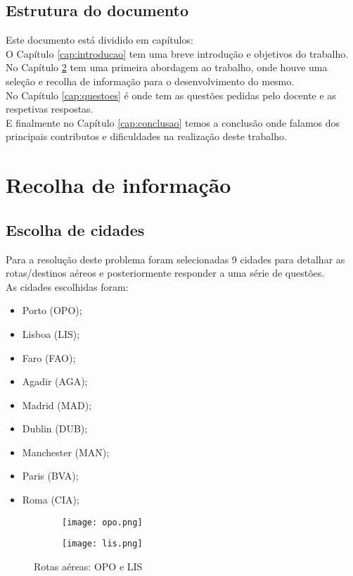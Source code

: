 \documentclass[a4wide]{report}
\begin{document}
\section{Estrutura do documento}
Este documento está dividido em  capítulos:\\O Capítulo \ref{cap:introducao} tem uma breve introdução e objetivos do trabalho.\\No Capítulo \ref{cap:recInfo} tem uma primeira abordagem ao trabalho, onde houve uma seleção e recolha de informação para o desenvolvimento do mesmo.\\No Capítulo \ref{cap:questoes} é onde tem as questões pedidas pelo docente e as respetivas respostas.\\E finalmente no Capítulo \ref{cap:conclusao} temos a conclusão onde falamos dos principais contributos e dificuldades na realização deste trabalho.

\chapter{Recolha de informação}
\label{cap:recInfo}
\section{Escolha de cidades}
Para a resolução deste problema foram selecionadas 9 cidades para detalhar as rotas/destinos aéreos e posteriormente responder a uma série de questões.\\
As cidades escolhidas foram:
\begin{itemize}
    \item Porto (OPO); 
    \item Lisboa (LIS); 
    \item Faro (FAO);
    \item Agadir (AGA); 
    \item Madrid (MAD); 
    \item Dublin (DUB); 
    \item Manchester (MAN); 
    \item Paris (BVA); 
    \item Roma (CIA); 
\end{itemize}

\begin{figure*}[t!]
    \centering
    \begin{subfigure}[t]{0.49\textwidth}
        \centering
        \texttt{[image: opo.png]}
            \end{subfigure}
            \begin{subfigure}[t]{0.49\textwidth}
        \centering
        \texttt{[image: lis.png]}
            \end{subfigure}
        \caption{Rotas aéreas: OPO e LIS}
\end{figure*}
\end{document}
